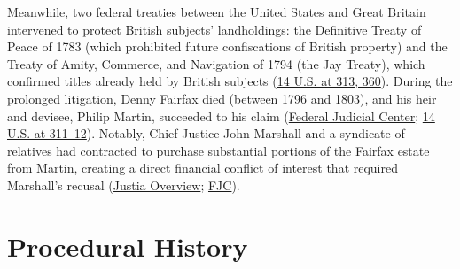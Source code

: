 \documentclass[12pt]{article}
\begin{document}
Meanwhile, two federal treaties between the United States and Great Britain intervened to protect British subjects' landholdings: the Definitive Treaty of Peace of 1783 (which prohibited future confiscations of British property) and the Treaty of Amity, Commerce, and Navigation of 1794 (the Jay Treaty), which confirmed titles already held by British subjects (\href{https://supreme.justia.com/cases/federal/us/14/304/}{14 U.S. at 313, 360}). During the prolonged litigation, Denny Fairfax died (between 1796 and 1803), and his heir and devisee, Philip Martin, succeeded to his claim (\href{https://www.fjc.gov/history/cases/cases-that-shaped-the-federal-courts/martin-v-hunter-s-lessee}{Federal Judicial Center}; \href{https://supreme.justia.com/cases/federal/us/14/304/}{14 U.S. at 311--12}). Notably, Chief Justice John Marshall and a syndicate of relatives had contracted to purchase substantial portions of the Fairfax estate from Martin, creating a direct financial conflict of interest that required Marshall's recusal (\href{https://supreme.justia.com/cases/federal/us/14/304/}{Justia Overview}; \href{https://www.fjc.gov/history/cases/cases-that-shaped-the-federal-courts/martin-v-hunter-s-lessee}{FJC}).

\section{Procedural History}
\end{document}
